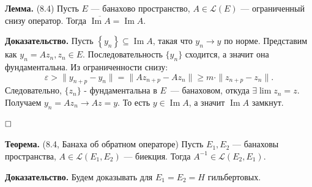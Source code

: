 \documentclass[12pt, a4paper]{article}
\DeclareMathOperator{\im}{Im}
\newcommand{\QED}{$\hfill\square$}
\renewcommand{\ge}{\geqslant}  %
\renewcommand{\L}{\mathcal{L}}   %
\renewcommand{\subset}{\subseteq}   %
\begin{document}
\textbf{Лемма.} (8.4)  \label{8.4_lemma}
        Пусть $E$ --- банахово пространство,
        $A \in \L(E)$ --- ограниченный снизу оператор. 
        Тогда $\overline{\im A} = \im A$.

\textbf{Доказательство.}
    Пусть \(\left\{y_n \right\} \subset \im A\), такая что \(y_n \rightarrow y\) по норме. Представим как $y_n = A z_n, z_n \in E$. Последовательность $\{y_n\}$ сходится, а значит она фундаментальна. Из ограниченности снизу:
    \[ \varepsilon > \|y_{n+p}-y_n\|=\|Az_{n+p}-Az_n\| \ge m \cdot \|z_{n+p} - z_n \|.\] 
    Следовательно, $\{z_n\}$ - фундаментальна в $E$~--- банаховом, откуда $\exists \lim z_n = z$. Получаем $y_n = A z_n \to A z = y$. То есть $y \in \im A$, а значит $\im A$ замкнут.

\QED

 \label{th:8-4} \textbf{Теорема.} (8.4, Банаха об обратном операторе) Пусть $E_1, E_2$ --- банаховы пространства, $A \in \mathcal L(E_1, E_2)$ --- биекция.
Тогда $A^{-1} \in \mathcal L(E_2, E_1)$.

\textbf{Доказательство.} Будем доказывать для $E_1 = E_2 = H$ гильбертовых.
\end{document}
